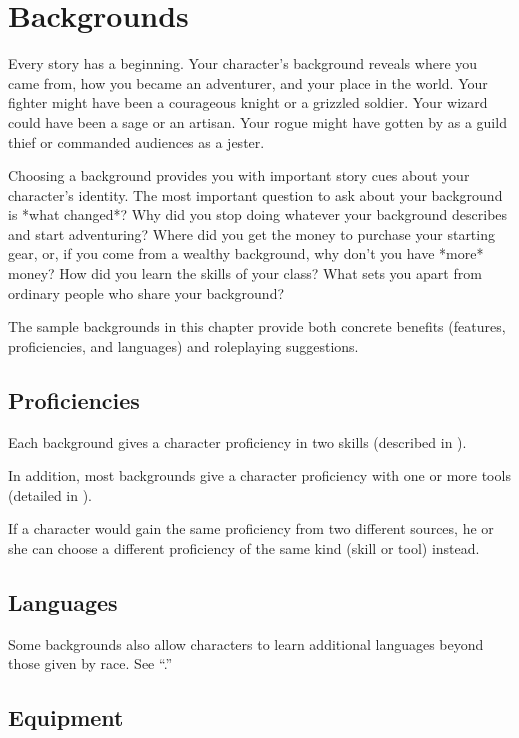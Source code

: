 \section{Backgrounds}
Every story has a beginning. Your character's background reveals where you came from, how you became an adventurer, and your place in the world. Your fighter might have been a courageous knight or a grizzled soldier. Your wizard could have been a sage or an artisan. Your rogue might have gotten by as a guild thief or commanded audiences as a jester.

Choosing a background provides you with important story cues about your character's identity. The most important question to ask about your background is *what changed*? Why did you stop doing whatever your background describes and start adventuring? Where did you get the money to purchase your starting gear, or, if you come from a wealthy background, why don't you have *more* money? How did you learn the skills of your class? What sets you apart from ordinary people who share your background?

The sample backgrounds in this chapter provide both concrete benefits (features, proficiencies, and languages) and roleplaying suggestions.

\subsection{Proficiencies}

Each background gives a character proficiency in two skills (described in ).

In addition, most backgrounds give a character proficiency with one or more tools (detailed in ).

If a character would gain the same proficiency from two different sources, he or she can choose a different proficiency of the same kind (skill or tool) instead.

\subsection{Languages}

Some backgrounds also allow characters to learn additional languages beyond those given by race. See “.”

\subsection{Equipment}


